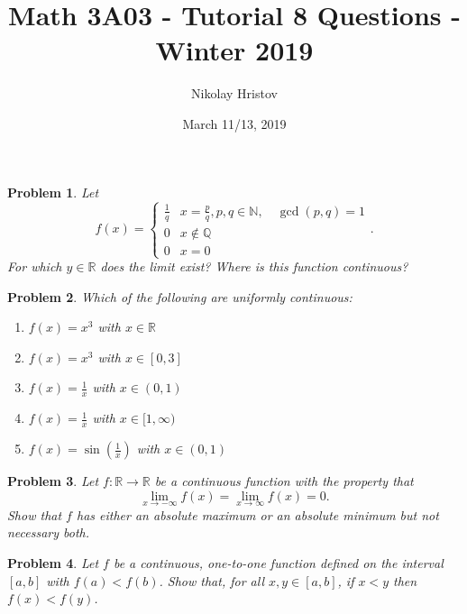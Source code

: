 \documentclass[11pt]{article}
\theoremstyle{plain}
\newtheorem{problem}{Problem}
\theoremstyle{remark}
\newcommand {\mbR} {\mathbb R}
\newcommand {\mbN} {\mathbb N}
\newcommand {\mbQ} {\mathbb Q}
\newcommand {\pwii}[6] {\begin{cases} 
		#1 & #2 \\
		#3 & #4 \\
		#5 & #6
\end{cases}}
\begin{document}
	\title{Math 3A03 - Tutorial 8 Questions - Winter 2019}
	\author{Nikolay Hristov}
	\date{March 11/13, 2019}
	\maketitle
	
	\begin{problem}
		Let \[f(x) = \pwii{\frac 1 q}{x=\frac p q,p,q\in\mbN, \quad\gcd(p,q)=1}{0}{x\notin \mbQ}{0}{x=0}.\] For which $y\in \mbR$ does the limit exist? Where is this function continuous?
	\end{problem}

	\begin{problem}
		Which of the following are uniformly continuous:
		
		\begin{enumerate}
			\item $f(x)=x^3$ with $x\in\mbR$
			\item $f(x)=x^3$ with $x\in [0,3]$
			\item $f(x)=\frac{1}{x}$ with $x\in(0,1)$
			\item $f(x)=\frac 1 x$ with $x\in [1,\infty)$
			\item $f(x)=\sin\left(\frac 1 x\right)$ with $x\in (0,1)$
		\end{enumerate}
	\end{problem}

\begin{problem}
	Let $f:\mbR \to \mbR$ be a continuous function with the property that 
	\begin{equation}
	\label{limits}
	\lim_{x\to -\infty} f(x) = \lim_{x\to \infty} f(x) = 0.
	\end{equation}
	Show that $f$ has either an absolute maximum or an absolute minimum but not necessary both.
\end{problem}

	\begin{problem}
	Let $f$ be a continuous, one-to-one function defined on the interval $[a,b]$ with $f(a)<f(b)$. Show that, for all $x,y \in [a,b]$, if $x<y$ then $f(x)<f(y)$.
\end{problem}
	
\end{document}
